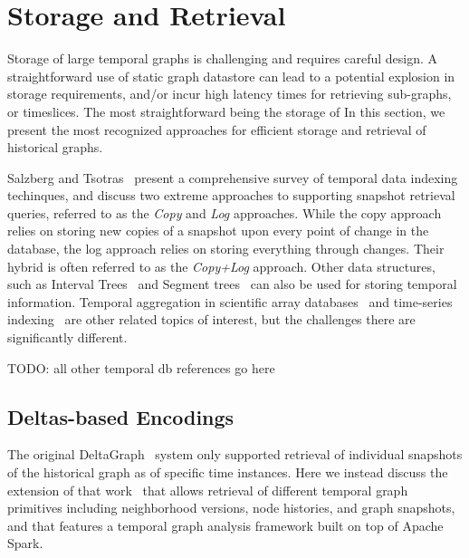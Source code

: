 \documentclass{svjour3}
\begin{document}
\section{Storage and Retrieval}

Storage of large temporal graphs is challenging and requires careful design. A straightforward use of static graph datastore can lead to a potential explosion in storage requirements, and/or incur high latency times for retrieving sub-graphs, or timeslices. The most straightforward being the storage of 
In this section, we present the most recognized approaches for efficient storage and retrieval of historical graphs.

Salzberg and Tsotras~\cite{Salzberg1999} present a comprehensive
survey of temporal data indexing techinques, and discuss two extreme approaches 
to supporting snapshot retrieval queries, referred to as the \textit{Copy} and \textit{Log} approaches. While the copy approach relies on storing new copies of a snapshot upon every point of change in the database, the log approach relies on storing everything through changes. Their hybrid is often referred to as the \textit{Copy+Log} approach.%
Other data structures, such as Interval Trees~\cite{Arge1996} and Segment trees~\cite{Blankenagel1994} can also be used for storing temporal information. Temporal aggregation in scientific array databases~\cite{soroush2013time} and time-series indexing~\cite{niennattrakul2010exact, camerra2013beyond, wang2013experimental} are other related topics of interest, but the challenges there are significantly different.

TODO: all other temporal db references go here


\subsection{Deltas-based Encodings}
The original DeltaGraph~\cite{khurana2013efficient} system only supported retrieval of individual snapshots of the historical graph as of specific time instances. Here we instead discuss the extension of that work~\cite{khurana2016storing} that allows retrieval of different temporal graph primitives including neighborhood versions, node histories, and graph snapshots, and that features a temporal graph analysis framework built on top of Apache Spark. 
\end{document}
